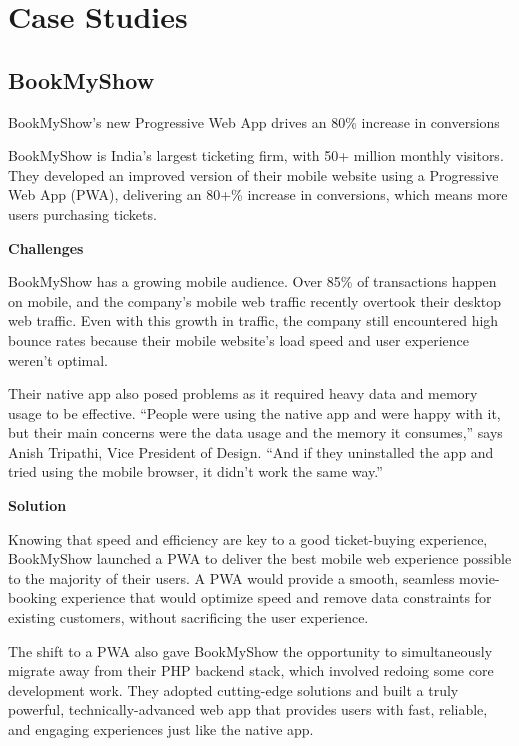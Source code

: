 \documentclass[14pt,a4paper,final]{extreport}
\begin{document}
\chapter{Case Studies}
\section{BookMyShow}
\item 
BookMyShow’s new Progressive Web App drives an 80\% increase in conversions


BookMyShow is India’s largest ticketing firm, with 50+ million monthly visitors. They developed an improved version of their mobile website using a Progressive Web App (PWA), delivering an 80+\% increase in conversions, which means more users purchasing tickets.
\item \textbf{Challenges}

BookMyShow has a growing mobile audience. Over 85\% of transactions happen on mobile, and the company’s mobile web traffic recently overtook their desktop web traffic. Even with this growth in traffic, the company still encountered high bounce rates because their mobile website's load speed and user experience weren’t optimal.

Their native app also posed problems as it required heavy data and memory usage to be effective. “People were using the native app and were happy with it, but their main concerns were the data usage and the memory it consumes,” says Anish Tripathi, Vice President of Design. “And if they uninstalled the app and tried using the mobile browser, it didn’t work the same way.”

\item \textbf{Solution}

Knowing that speed and efficiency are key to a good ticket-buying experience, BookMyShow launched a PWA to deliver the best mobile web experience possible to the majority of their users. A PWA would provide a smooth, seamless movie- booking experience that would optimize speed and remove data constraints for existing customers, without sacrificing the user experience.

The shift to a PWA also gave BookMyShow the opportunity to simultaneously migrate away from their PHP backend stack, which involved redoing some core development work. They adopted cutting-edge solutions and built a truly powerful, technically-advanced web app that provides users with fast, reliable, and engaging experiences just like the native app.
\end{document}
